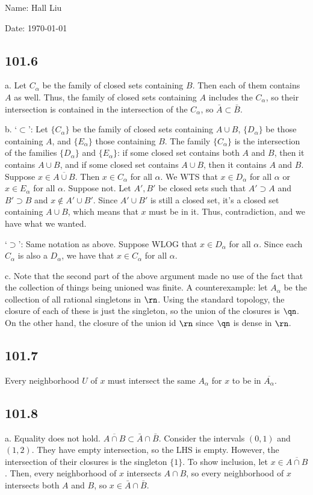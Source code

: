 \documentclass{article}
\begin{document}
Name: Hall Liu

Date: \today 
\vspace{1.5cm}
\subsection*{101.6}
a. Let $C_\alpha$ be the family of closed sets containing $B$. Then each of them contains $A$ as well. Thus, the family of closed sets containing $A$ includes the $C_\alpha$, so their intersection is contained in the intersection of the $C_\alpha$, so $\bar{A}\subset\bar{B}$.

b. `$\subset$': Let $\{C_\alpha\}$ be the family of closed sets containing $A\cup B$, $\{D_\alpha\}$ be those containing $A$, and $\{E_\alpha\}$ those containing $B$. The family $\{C_\alpha\}$ is the intersection of the families $\{D_\alpha\}$ and $\{E_\alpha\}$: if some closed set contains both $A$ and $B$, then it contains $A\cup B$, and if some closed set contains $A\cup B$, then it contains $A$ and $B$. Suppose $x\in\overline{A\cup B}$. Then $x\in C_\alpha$ for all $\alpha$. We WTS that $x\in D_\alpha$ for all $\alpha$ or $x\in E_\alpha$ for all $\alpha$. Suppose not. Let $A',B'$ be closed sets such that $A'\supset A$ and $B'\supset B$ and $x\not\in A'\cup B'$. Since $A'\cup B'$ is still a closed set, it's a closed set containing $A\cup B$, which means that $x$ must be in it. Thus, contradiction, and we have what we wanted.

`$\supset$': Same notation as above. Suppose WLOG that $x\in D_\alpha$ for all $\alpha$. Since each $C_\alpha$ is also a $D_\alpha$, we have that $x\in C_\alpha$ for all $\alpha$.

c. Note that the second part of the above argument made no use of the fact that the collection of things being unioned was finite. A counterexample: let $A_\alpha$ be the collection of all rational singletons in $\rn$. Using the standard topology, the closure of each of these is just the singleton, so the union of the closures is $\qn$. On the other hand, the closure of the union id $\rn$ since $\qn$ is dense in $\rn$.

\subsection*{101.7}
Every neighborhood $U$ of $x$ must intersect the same $A_\alpha$ for $x$ to be in $\overline{A_\alpha}$.
\subsection*{101.8}
a. Equality does not hold. $\overline{A\cap B}\subset\bar{A}\cap\bar{B}$. Consider the intervals $(0,1)$ and $(1,2)$. They have empty intersection, so the LHS is empty. However, the intersection of their closures is the singleton $\{1\}$. To show inclusion, let $x\in\overline{A\cap B}$. Then, every neighborhood of $x$ intersects $A\cap B$, so every neighborhood of $x$ intersects both $A$ and $B$, so $x\in\bar{A}\cap\bar{B}$.
\end{document}
